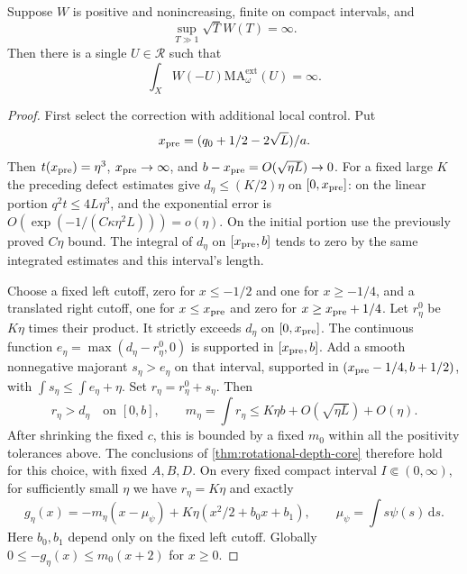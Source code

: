 \begin{theorem}\label{thm:rotational-infinite-weighted-measure}
Suppose $W$ is positive and nonincreasing, finite on compact intervals, and
\[
 \sup_{T\gg1}\sqrt T W(T)=\infty.
\]
Then there is a single $U\in\mathcal R$ such that
\[
 \int_XW(-U)\mathrm{MA}^{\mathrm{ext}}_\omega(U)=\infty.
\]
\end{theorem}
\begin{proof}
First select the correction with additional local control. Put
\[
 x_{\rm pre}=(q_0+1/2-2\sqrt L)/a.
\]
Then $t(x_{\rm pre})=\eta^3$, $x_{\rm pre}\to\infty$, and
$b-x_{\rm pre}=O(\sqrt{\eta L})\to0$.
For a fixed large $K$ the preceding defect estimates give
$d_\eta\leq(K/2)\eta$ on $[0,x_{\rm pre}]$:
on the linear portion $q^2t\leq4L\eta^3$, and the exponential error is
$O(\exp(-1/(C\kappa\eta^2L)))=o(\eta)$.
On the initial portion use the previously proved $C\eta$ bound.
The integral of $d_\eta$ on $[x_{\rm pre},b]$ tends to zero by the same
integrated estimates and this interval's length.

Choose a fixed left cutoff, zero for $x\leq-1/2$ and one for $x\geq-1/4$,
and a translated right cutoff, one for $x\leq x_{\rm pre}$ and zero for
$x\geq x_{\rm pre}+1/4$.
Let $r^0_\eta$ be $K\eta$ times their product. It strictly exceeds $d_\eta$
on $[0,x_{\rm pre}]$. The continuous function
$e_\eta=\max(d_\eta-r^0_\eta,0)$ is supported in $[x_{\rm pre},b]$.
Add a smooth nonnegative majorant $s_\eta>e_\eta$ on that interval,
supported in $(x_{\rm pre}-1/4,b+1/2)$, with
$\int s_\eta\leq\int e_\eta+\eta$.
Set $r_\eta=r^0_\eta+s_\eta$. Then
\[
 r_\eta>d_\eta\quad\text{on }[0,b],\qquad
 m_\eta=\int r_\eta\leq K\eta b+O(\sqrt{\eta L})+O(\eta).
\]
After shrinking the fixed $c$, this is bounded by a fixed $m_0$ within all
the positivity tolerances above. The conclusions of \cref{thm:rotational-depth-core} therefore hold for this choice, with fixed $A,B,D$.
On every fixed compact interval $I\Subset(0,\infty)$, for sufficiently small
$\eta$ we have $r_\eta=K\eta$ and exactly
\begin{equation}\label{eq:rotational-controlled-correction}
 g_\eta(x)=-m_\eta(x-\mu_\psi)
              +K\eta(x^2/2+b_0x+b_1),\qquad
 \mu_\psi=\int s\psi(s)\,\mathrm ds.
\end{equation}
Here $b_0,b_1$ depend only on the fixed left cutoff.
Globally $0\leq-g_\eta(x)\leq m_0(x+2)$ for $x\geq0$.


\end{proof}
